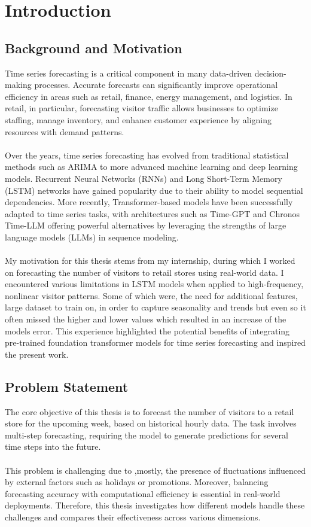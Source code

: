 \documentclass{article}
\begin{document}
\section{Introduction}
\subsection{Background and Motivation}
Time series forecasting is a critical component in many data-driven decision-making processes. Accurate forecasts can significantly improve operational efficiency in areas such as retail, finance, energy management, and logistics. In retail, in particular, forecasting visitor traffic allows businesses to optimize staffing, manage inventory, and enhance customer experience by aligning resources with demand patterns.\\
\\
Over the years, time series forecasting has evolved from traditional statistical methods such as ARIMA to more advanced machine learning and deep learning models. Recurrent Neural Networks (RNNs) and Long Short-Term Memory (LSTM) networks have gained popularity due to their ability to model sequential dependencies. More recently, Transformer-based models have been successfully adapted to time series tasks, with architectures such as Time-GPT and Chronos Time-LLM offering powerful alternatives by leveraging the strengths of large language models (LLMs) in sequence modeling.\\
\\
My motivation for this thesis stems from my internship, during which I worked on forecasting the number of visitors to retail stores using real-world data. I encountered various limitations in LSTM models when applied to high-frequency, nonlinear visitor patterns. Some of which were, the need for additional features, large dataset to train on, in order to capture seasonality and trends but even so it often missed the higher and lower values which resulted in an increase of the models error. This experience highlighted the potential benefits of integrating pre-trained foundation transformer models for time series forecasting and inspired the present work.

\subsection{Problem Statement}
The core objective of this thesis is to forecast the number of visitors to a retail store for the upcoming week, based on historical hourly data. The task involves multi-step forecasting, requiring the model to generate predictions for several time steps into the future.\\
\\
This problem is challenging due to ,mostly, the presence of fluctuations influenced by external factors such as holidays or promotions. Moreover, balancing forecasting accuracy with computational efficiency is essential in real-world deployments. Therefore, this thesis investigates how different models handle these challenges and compares their effectiveness across various dimensions.
\end{document}
